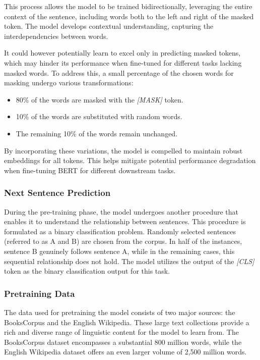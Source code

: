 \documentclass[a4paper,10pt]{report}
\begin{document}
This process allows the model to be trained bidirectionally, leveraging the entire context of the sentence, including words both to the left and right of the masked token. The model develops contextual understanding, capturing the interdependencies between words.

It could however potentially learn to excel only in predicting masked tokens, which may hinder its performance when fine-tuned for different tasks lacking masked words. To address this, a small percentage of the chosen words for masking undergo various transformations:

\begin{itemize}
  \item 80\% of the words are masked with the \textit{[MASK]} token.
  \item 10\% of the words are substituted with random words.
  \item The remaining 10\% of the words remain unchanged.
\end{itemize}

By incorporating these variations, the model is compelled to maintain robust embeddings for all tokens. This helps mitigate potential performance degradation when fine-tuning BERT for different downstream tasks. \cite{bert}

\subsubsection{Next Sentence Prediction}
During the pre-training phase, the model undergoes another procedure that enables it to understand the relationship between sentences. This procedure is formulated as a binary classification problem. Randomly selected sentences (referred to as A and B) are chosen from the corpus. In half of the instances, sentence B genuinely follows sentence A, while in the remaining cases, this sequential relationship does not hold. The model utilizes the output of the \textit{[CLS]} token as the binary classification output for this task. \cite{bert}

\subsubsection{Pretraining Data}
The data used for pretraining the model consists of two major sources: the BooksCorpus and the English Wikipedia. These large text collections provide a rich and diverse range of linguistic content for the model to learn from. The BooksCorpus dataset encompasses a substantial 800 million words, while the English Wikipedia dataset offers an even larger volume of 2,500 million words. 
\end{document}

